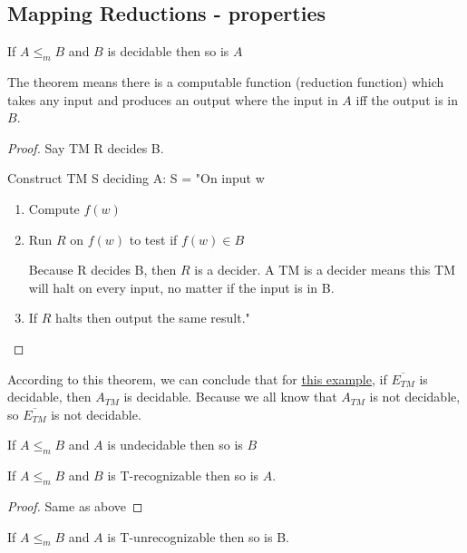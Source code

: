\subsection{Mapping Reductions - properties}

\begin{theorem}
    If \(A \leq_m B\) and \(B\) is decidable then so is \(A\)   
\end{theorem}
The theorem means there is a computable function (reduction function) which takes any input and produces an output where the input in \(A\) iff the output is in \(B\).  
\begin{proof}
    Say TM R decides B.

    Construct TM S deciding A:
    S = "On input w
    \begin{enumerate}
        \item Compute \(f(w)\)
        \item Run \(R\) on \(f(w)\) to test if \(f(w) \in B\) 
        \begin{remark}
            Because R decides B, then \(R\) is a decider. A TM is a decider means this TM will halt on every input, no matter if the input is in B. 
        \end{remark}
        \item If \(R\) halts then output the same result."
    \end{enumerate}
\end{proof}
\begin{remark}
    According to this theorem, we can conclude that for \hyperref[example: 9.1]{this example}, if \(\overline{E_{TM}}\) is decidable, then \(A_{TM}\) is decidable.  
    Because we all know that \(A_{TM}\) is not decidable, so \(\overline{E_{TM}}\) is not decidable.  
\end{remark}


\begin{corollary}
    If \(A \leq_m B\) and \(A\) is undecidable then so is \(B\)   
\end{corollary}

\begin{theorem}
    If \(A \leq_m B\) and \(B\) is T-recognizable then so is \(A\).   
\end{theorem}
\begin{proof}
    Same as above    
\end{proof}

\begin{corollary}
    If \(A \leq_m B\) and \(A\) is T-unrecognizable then so is B. 
\end{corollary}

